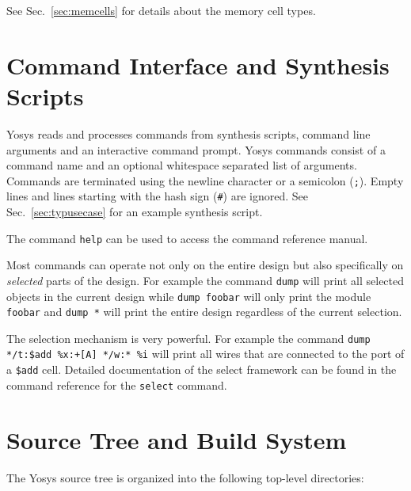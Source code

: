See Sec.~\ref{sec:memcells} for details about the memory cell types.

\section{Command Interface and Synthesis Scripts}

Yosys reads and processes commands from synthesis scripts, command line arguments and
an interactive command prompt. Yosys commands consist of a command name and an optional
whitespace separated list of arguments. Commands are terminated using the newline character
or a semicolon ({\tt ;}). Empty lines and lines starting with the hash sign ({\tt \#}) are ignored.
See Sec.~\ref{sec:typusecase} for an example synthesis script.

The command {\tt help} can be used to access the command reference manual.

Most commands can operate not only on the entire design but also specifically on {\it selected}
parts of the design. For example the command {\tt dump} will print all selected objects
in the current design while {\tt dump foobar} will only print the module {\tt foobar}
and {\tt dump *} will print the entire design regardless of the current selection.

The selection mechanism is very powerful. For example the command {\tt dump */t:\$add
\%x:+[A] */w:* \%i} will print all wires that are connected to the  port of
a {\tt \$add} cell.  Detailed documentation of the select framework can be
found in the command reference for the {\tt select} command.

\section{Source Tree and Build System}

The Yosys source tree is organized into the following top-level directories:

